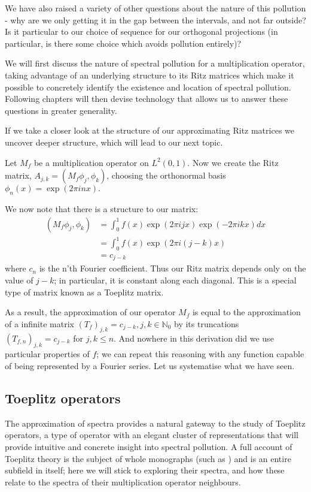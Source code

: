 \documentclass[../main.tex]{subfiles}
\begin{document}
We have also raised a variety of other questions about the nature of this
pollution - why are we only getting it in the gap between the intervals, and not
far outside? Is it particular to our choice of sequence for our orthogonal
projections (in particular, is there some choice which avoids pollution
entirely)?

We will first discuss the nature of spectral pollution for a multiplication
operator, taking advantage of an underlying structure to its Ritz matrices which
make it possible to concretely identify the existence and location of spectral
pollution. Following chapters will then devise technology that allows us to 
answer these questions in greater generality.

If we take a closer look at the structure of our approximating Ritz matrices we
uncover deeper structure, which will lead to our next topic.
\begin{example}\label{exp:mult-op-toeplitz}
Let $M_f$ be a multiplication operator on $L^2(0, 1)$. Now we create the Ritz
matrix, $A_{j,k} = (M_f \phi_j, \phi_k)$, choosing the orthonormal basis
$\phi_n(x) = \exp(2 \pi i n x).$

We now note that there is a structure to our matrix:
\begin{align*}
(M_f \phi_j, \phi_k) & = \int_0^1 f(x) \exp(2 \pi i j x) \exp(-2 \pi i k x) dx \\
& = \int_0^1 f(x) \exp(2 \pi i (j-k) x)\\
& = c_{j-k}
\end{align*}
where $c_n$ is the n'th Fourier coefficient. Thus our Ritz matrix depends only
on the value of $j-k$; in particular, it is constant along each
diagonal. This is a special type of matrix known as a Toeplitz matrix.
\end{example}
As a result, the approximation of our operator $M_f$ is equal to the
approximation of a infinite matrix $(T_f)_{j,k} = c_{j-k}, j,k \in \mathbb{N}_0$
by its truncations $(T_{f,n})_{j,k} = c_{j-k}$ for $j, k \leq n$. And nowhere in
this derivation did we use particular
properties of $f$; we can repeat this reasoning with any function capable of
being represented by a Fourier series. Let us systematise what we have seen.

\subsection{Toeplitz operators}\label{sec:toeplitz}

The approximation of spectra provides a natural gateway to the study of Toeplitz
operators, a type of operator with an elegant cluster of representations that
will provide intuitive and concrete insight into spectral pollution. A full
account of Toeplitz theory is the subject
of whole monographs (such as \parencite{bottcher1990analysis}) and is an entire
subfield in itself; here we will stick to exploring their spectra, and how these
relate to the spectra of their multiplication operator neighbours. 
\end{document}
